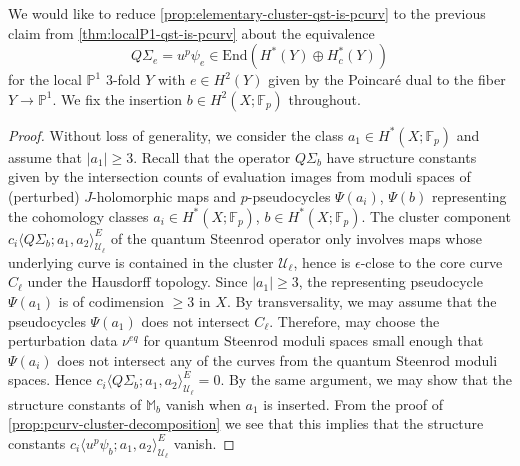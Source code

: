 \documentclass[reqno]{amsart}
\numberwithin{equation}{section}
\numberwithin{equation}{section}
\numberwithin{equation}{section}
\newtheorem{lemma}[thm]{Lemma}
\theoremstyle{definition}
\theoremstyle{remark}
\theoremstyle{remark}
\begin{document}
We would like to reduce \cref{prop:elementary-cluster-qst-is-pcurv} to the previous claim from \cref{thm:localP1-qst-is-pcurv} about the equivalence
\begin{equation}
    Q\Sigma_e = u^p \psi_e \in \mathrm{End}(H^*(Y) \oplus H^*_c(Y))
\end{equation}
for the local $\mathbb{P}^1$ 3-fold $Y$ with $e \in H^2(Y)$ given by the Poincar\'e dual to the fiber $Y \to \mathbb{P}^1$. We fix the insertion $b \in  H^2(X;\mathbb{F}_p)$ throughout. 

\begin{proof}
    Without loss of generality, we consider the class $a_1 \in H^*(X;\mathbb{F}_p)$ and assume that  $|a_1| \ge 3$. Recall that the operator $Q\Sigma_b$ have structure constants given by the intersection counts of evaluation images from moduli spaces of (perturbed) $J$-holomorphic maps and $p$-pseudocycles $\Psi(a_i)$, $\Psi(b)$ representing the cohomology classes $a_i \in H^*(X;\mathbb{F}_p)$, $b \in H^*(X;\mathbb{F}_p)$. The cluster component $ c_i \langle Q\Sigma_b ; a_1, a_2 \rangle^E_{\mathcal{U}_\ell}$ of the quantum Steenrod operator only involves maps whose underlying curve is contained in the cluster $\mathcal{U}_\ell$, hence is $\epsilon$-close to the core curve $C_\ell$ under the Hausdorff topology. Since $|a_1| \ge 3$, the representing pseudocycle $\Psi(a_1)$ is of codimension $\ge 3$ in $X$. By transversality, we may assume that the pseudocycles $\Psi(a_1)$ does not intersect $C_\ell$. Therefore, may choose the perturbation data $\nu^{eq}$ for quantum Steenrod moduli spaces small enough that $\Psi(a_i)$ does not intersect any of the curves from the quantum Steenrod moduli spaces. Hence $c_i \langle Q\Sigma_b ; a_1, a_2 \rangle_{\mathcal{U}_\ell}^E = 0$. By the same argument, we may show that the structure constants of $\mathbb{M}_b$ vanish when $a_1$ is inserted. From the proof of \cref{prop:pcurv-cluster-decomposition} we see that this implies that the structure constants $c_i \langle u^p \psi_b; a_1, a_2 \rangle_{\mathcal{U}_\ell}^E$ vanish.
    
\end{proof}
\end{document}
